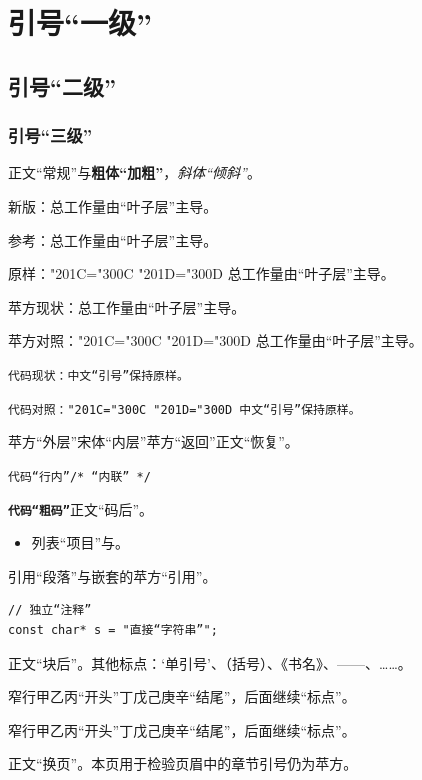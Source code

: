 \tableofcontents
\section{引号“一级”}
\subsection{引号“二级”}
\subsubsection{引号“三级”}
正文“常规”与\textbf{粗体“加粗”}，\textit{斜体“倾斜”}。

\noindent 新版：总工作量由“叶子层”主导。\par
\noindent 参考：总工作量由``叶子层''主导。\par
\noindent 原样：{\XeTeXcharclass"201C=\XeTeXcharclass"300C
\XeTeXcharclass"201D=\XeTeXcharclass"300D
总工作量由“叶子层”主导。}\par

\textsf{苹方现状：总工作量由“叶子层”主导。}\par
\textsf{苹方对照：\XeTeXcharclass"201C=\XeTeXcharclass"300C
\XeTeXcharclass"201D=\XeTeXcharclass"300D
总工作量由“叶子层”主导。}\par
\texttt{代码现状：中文“引号”保持原样。}\par
\texttt{代码对照：\XeTeXcharclass"201C=\XeTeXcharclass"300C
\XeTeXcharclass"201D=\XeTeXcharclass"300D
中文“引号”保持原样。}\par

\textsf{苹方“外层”\textrm{宋体“内层”}苹方“返回”}正文“恢复”。

\texttt{代码“行内”}\quad\texttt{/* “内联” */}

\textbf{\texttt{代码“粗码”}}正文“码后”。

\begin{itemize}
\item 列表“项目”与。
\end{itemize}
\begin{quoteblock}
引用“段落”与嵌套的\textsf{苹方“引用”}。
\end{quoteblock}
\begin{verbatim}
// 独立“注释”
const char* s = "直接“字符串”";
\end{verbatim}
正文“块后”。其他标点：‘单引号’、（括号）、《书名》、——、……。

\noindent\parbox{7em}{窄行甲乙丙“开头”丁戊己庚辛“结尾”，后面继续“标点”。}
\quad\parbox{8em}{窄行甲乙丙“开头”丁戊己庚辛“结尾”，后面继续“标点”。}

\newpage
正文“换页”。本页用于检验页眉中的章节引号仍为苹方。
